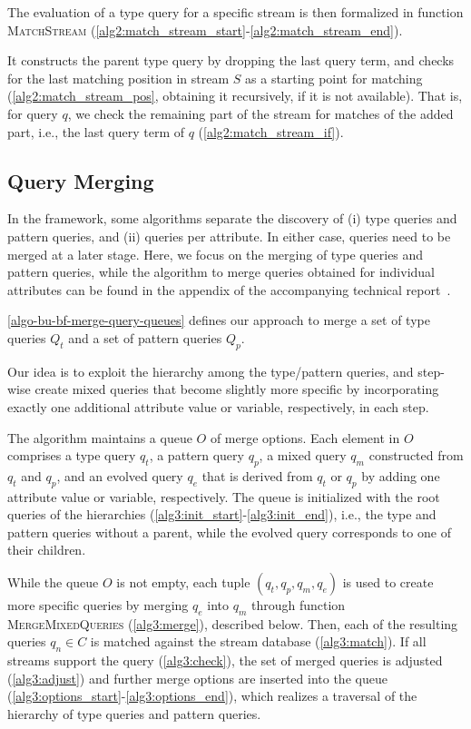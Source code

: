The evaluation of a type query for a specific stream is then formalized in
function \textsc{MatchStream}
(\autoref{alg2:match_stream_start}-\ref{alg2:match_stream_end}).

It constructs the parent type query
by dropping the last query term, and
checks for the last matching position in stream $S$ as a starting point for
matching (\autoref{alg2:match_stream_pos}, obtaining it recursively, if it
is not available). That is, for query $q$, we check the remaining part of
the stream for matches of the added part, i.e., the last query term of $q$
(\autoref{alg2:match_stream_if}).


\subsection{Query Merging}
\label{sec:merging}

In the \sys{} framework, some algorithms separate the discovery of (i) type
queries and pattern queries, and (ii) queries per attribute. In either case,
queries need to be merged at a later stage. Here, we focus on the merging of
type queries and pattern queries, while the algorithm to merge queries
obtained for individual attributes can be found in the
appendix of the accompanying technical report~\cite{disces_TR}.

\autoref{algo-bu-bf-merge-query-queues} defines our approach to merge a set
of type queries $Q_t$ and a set of pattern queries $Q_p$.

Our idea is to exploit the hierarchy
among the type/pattern queries, and step-wise create mixed
queries that become slightly
more specific by incorporating exactly one additional attribute value or
variable, respectively, in each step.

The algorithm maintains a queue $O$ of merge options.
Each element in $O$ comprises a type query $q_t$, a pattern query $q_p$, a
mixed query $q_m$ constructed from $q_t$ and $q_p$, and an evolved query
$q_e$ that is derived from $q_t$ or $q_p$ by adding one attribute value or
variable, respectively. The queue is initialized with the root queries of
the hierarchies (\autoref{alg3:init_start}-\ref{alg3:init_end}), i.e., the
type and pattern queries without a parent, while the evolved query
corresponds to one of their children.

While the queue ${O}$ is not empty, each tuple $(\mathit{q_t}, \mathit{q_p},
\mathit{q_m}, \mathit{q_e})$ is used to create more
specific queries by merging $\mathit{q_e}$ into $\mathit{q_m}$ through
function \textsc{MergeMixedQueries} (\autoref{alg3:merge}), described below.
Then, each of the resulting queries ${q_n}\in C$ is matched against the
stream database (\autoref{alg3:match}). If all streams support the query
(\autoref{alg3:check}), the set of merged queries is adjusted
(\autoref{alg3:adjust}) and
further merge options are inserted into the queue
(\autoref{alg3:options_start}-\ref{alg3:options_end}), which realizes a
traversal of the hierarchy of type queries and pattern queries.


